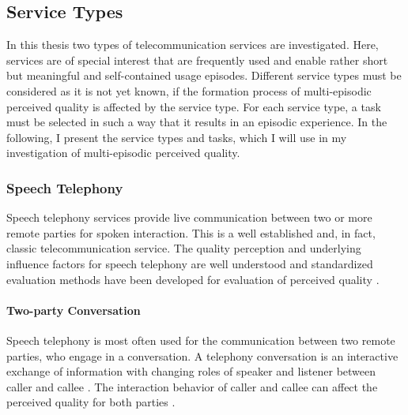\subsection{Service Types}
In this thesis two types of telecommunication services are investigated.
Here, services are of special interest that are frequently used and enable rather short but meaningful and self-contained usage episodes.
Different service types must be considered as it is not yet known, if the formation process of multi-episodic perceived quality is affected by the service type.
For each service type, a task must be selected in such a way that it results in an episodic experience.
In the following, I present the service types and tasks, which I will use in my investigation of multi-episodic perceived quality.

\subsubsection*{Speech Telephony}\label{method:sct}
Speech telephony services provide live communication between two or more remote parties for spoken interaction.
This is a well established and, in fact, classic telecommunication service.
The quality perception and underlying influence factors for speech telephony are well understood and standardized evaluation methods have been developed for evaluation of perceived quality \citep[\eg,][]{itu_handbook_1992}.

\paragraph*{Two-party Conversation}
Speech telephony is most often used for the communication between two remote parties, who engage in a conversation.
A telephony conversation is an interactive exchange of information with changing roles of speaker and listener between caller and callee \citep[][]{hopper_telephone_1992}.
The interaction behavior of caller and callee can affect the perceived quality for both parties \citep[\eg,][]{schoenenberg_why_2014, egger_it_2010}.

